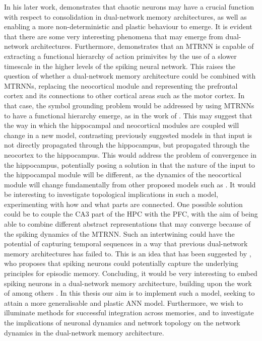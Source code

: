 In his later work, \cite{Hattori2014} demonstrates that chaotic neurons may have a crucial function with respect to consolidation in dual-network memory architectures, as well as enabling a more non-deterministic and plastic behaviour to emerge. It is evident that there are some very interesting phenomena that may emerge from dual-network architectures. Furthermore, \cite{Tani2014} demonstrates that an MTRNN is capable of extracting a functional hierarchy of action primivites by the use of a slower timescale in the higher levels of the spiking neural network. This raises the question of whether a dual-network memory architecture could be combined with MTRNNs, replacing the neocortical module and representing the prefrontal cortex and its connections to other cortical areas such as the motor cortex. In that case, the symbol grounding problem would be addressed by using MTRNNs to have a functional hierarchy emerge, as in the work of \cite{Tani2014}. This may suggest that the way in which the hippocampal and neocortical modules are coupled will change in a new model, contrasting previously suggested models in that input is not directly propagated through the hippocampus, but propagated through the neocortex to the hippocampus. This would address the problem of convergence in the hippocampus, potentially posing a solution in that the nature of the input to the hippocampal module will be different, as the dynamics of the neocortical module will change fundamentally from other proposed models such as \cite{Ans1997, Ans2000, French2001}. It would be interesting to investigate topological implications in such a model, experimenting with how and what parts are connected. One possible solution could be to couple the CA3 part of the HPC with the PFC, with the aim of being able to combine different abstract representations that may converge because of the spiking dynamics of the MTRNN. Such an intertwining could have the potential of capturing temporal sequences in a way that previous dual-network memory architectures has failed to. This is an idea that has been suggested by \cite{Hattori2014}, who proposes that spiking neurons could potentially capture the underlying principles for episodic memory. Concluding, it would be very interesting to embed spiking neurons in a dual-network memory architecture, building upon the work of among others \cite{Yamashita2008, McClelland1995, Hattori2014}. In this thesis our aim is to implement such a model, seeking to attain a more generalisable and plastic ANN model. Furthermore, we wish to illuminate methods for successful integration across memories, and to investigate the implications of neuronal dynamics and network topology on the network dynamics in the dual-network memory architecture.


\cleardoublepage